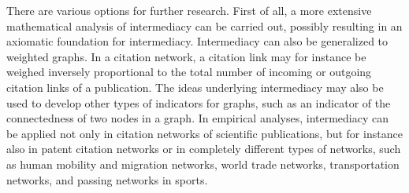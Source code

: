 \documentclass[9pt,twocolumn,twoside,lineno]{pnas-alt}
\theoremstyle{definition}
\begin{document}
There are various options for further research. First of all, a more extensive mathematical analysis of intermediacy can be carried out, possibly resulting in an axiomatic foundation for intermediacy. Intermediacy can also be generalized to weighted graphs. In a citation network, a citation link may for instance be weighed inversely proportional to the total number of incoming or outgoing citation links of a publication. The ideas underlying intermediacy may also be used to develop other types of indicators for graphs, such as an indicator of the connectedness of two nodes in a graph. In empirical analyses, intermediacy can be applied not only in citation networks of scientific publications, but for instance also in patent citation networks or in completely different types of networks, such as human mobility and migration networks, world trade networks, transportation networks, and passing networks in sports.

%
%
\end{document}
